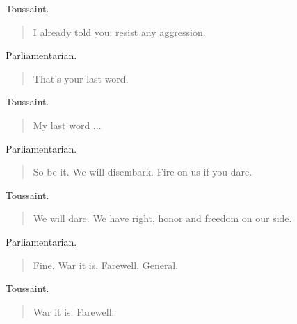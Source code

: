 \documentclass[letterpaper,article,12pt,oneside,notitlepage]{memoir}
\begin{document}
\begin{center}Toussaint.\end{center}

\begin{verse}
I already told you: resist any aggression. \\
\end{verse}

\begin{center}Parliamentarian.\end{center}

\begin{verse}
That's your last word. \\
\end{verse}

\begin{center}Toussaint.\end{center}

\begin{verse}
My last word ... \\
\end{verse}

\begin{center}Parliamentarian.\end{center}

\begin{verse}
So be it. We will disembark. Fire on us if you dare. \\
\end{verse}

\begin{center}Toussaint.\end{center}

\begin{verse}
We will dare. We have right, honor and freedom on our side. \\
\end{verse}

\begin{center}Parliamentarian.\end{center}

\begin{verse}
Fine. War it is. Farewell, General. \\
\end{verse}

\begin{center}Toussaint.\end{center}

\begin{verse}
War it is. Farewell. \\
\end{verse}
\end{document}
